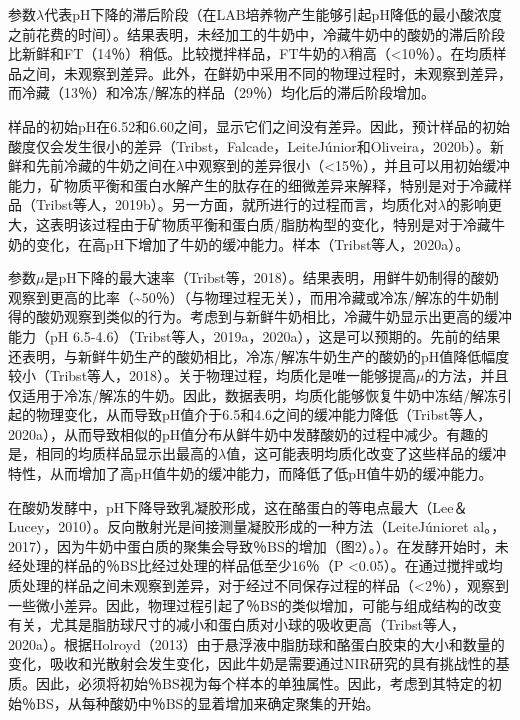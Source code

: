 \documentclass[twocolumn]{ctexart}
\begin{document}
参数$\lambda$代表pH下降的滞后阶段（在LAB培养物产生能够引起pH降低的最小酸浓度之前花费的时间）。结果表明，未经加工的牛奶中，冷藏牛奶中的酸奶的滞后阶段比新鲜和FT（14％）稍低。比较搅拌样品，FT牛奶的$\lambda$稍高（<10％）。在均质样品之间，未观察到差异。此外，在鲜奶中采用不同的物理过程时，未观察到差异，而冷藏（13％）和冷冻/解冻的样品（29％）均化后的滞后阶段增加。

样品的初始pH在6.52和6.60之间，显示它们之间没有差异。因此，预计样品的初始酸度仅会发生很小的差异（Tribst，Falcade，LeiteJúnior和Oliveira，2020b）。新鲜和先前冷藏的牛奶之间在$\lambda$中观察到的差异很小（<15％），并且可以用初始缓冲能力，矿物质平衡和蛋白水解产生的肽存在的细微差异来解释，特别是对于冷藏样品（Tribst等人，2019b）。另一方面，就所进行的过程而言，均质化对$\lambda$的影响更大，这表明该过程由于矿物质平衡和蛋白质/脂肪构型的变化，特别是对于冷藏牛奶的变化，在高pH下增加了牛奶的缓冲能力。样本（Tribst等人，2020a）。

参数$\mu$是pH下降的最大速率（Tribst等，2018）。结果表明，用鲜牛奶制得的酸奶观察到更高的比率（\textasciitilde50％）（与物理过程无关），而用冷藏或冷冻/解冻的牛奶制得的酸奶观察到类似的行为。考虑到与新鲜牛奶相比，冷藏牛奶显示出更高的缓冲能力（pH 6.5-4.6）（Tribst等人，2019a，2020a），这是可以预期的。先前的结果还表明，与新鲜牛奶生产的酸奶相比，冷冻/解冻牛奶生产的酸奶的pH值降低幅度较小（Tribst等人，2018）。关于物理过程，均质化是唯一能够提高$\mu$的方法，并且仅适用于冷冻/解冻的牛奶。因此，数据表明，均质化能够恢复牛奶中冻结/解冻引起的物理变化，从而导致pH值介于6.5和4.6之间的缓冲能力降低（Tribst等人，2020a），从而导致相似的pH值分布从鲜牛奶中发酵酸奶的过程中减少。有趣的是，相同的均质样品显示出最高的$\lambda$值，这可能表明均质化改变了这些样品的缓冲特性，从而增加了高pH值牛奶的缓冲能力，而降低了低pH值牛奶的缓冲能力。

在酸奶发酵中，pH下降导致乳凝胶形成，这在酪蛋白的等电点最大（Lee＆Lucey，2010）。反向散射光是间接测量凝胶形成的一种方法（LeiteJúnioret al。，2017），因为牛奶中蛋白质的聚集会导致％BS的增加（图2）。）。在发酵开始时，未经处理的样品的％BS比经过处理的样品低至少16％（P <0.05）。在通过搅拌或均质处理的样品之间未观察到差异，对于经过不同保存过程的样品（<2％），观察到一些微小差异。因此，物理过程引起了％BS的类似增加，可能与组成结构的改变有关，尤其是脂肪球尺寸的减小和蛋白质对小球的吸收更高（Tribst等人，2020a）。根据Holroyd（2013）由于悬浮液中脂肪球和酪蛋白胶束的大小和数量的变化，吸收和光散射会发生变化，因此牛奶是需要通过NIR研究的具有挑战性的基质。因此，必须将初始％BS视为每个样本的单独属性。因此，考虑到其特定的初始％BS，从每种酸奶中％BS的显着增加来确定聚集的开始。
\end{document}
